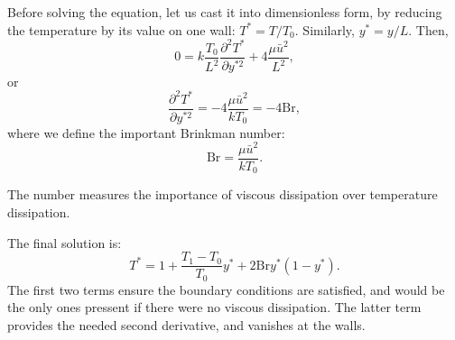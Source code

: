 Before solving the equation, let us cast it into dimensionless form,
by reducing the temperature by its value on one wall: $T^* =
T/T_0$. Similarly, $y^* = y/L$. Then,
\[
0 = k\frac{T_0}{ L^2} \frac{\partial^2 T^*}{\partial y^{*2}} +
4  \frac{ \mu \bar{u}^2  }{L^2} ,
\]
or
\[
 \frac{\partial^2 T^*}{\partial y^{*2}} = 
 -4  \frac{ \mu \bar{u}^2 }{ k T_0 }  =
 -4 \mathrm{Br} ,
\]
where we define the important Brinkman number:
\[
\mathrm{Br} =
\frac{ \mu \bar{u}^2 }{ k T_0 } .
\]

The number measures the importance of viscous dissipation over
temperature dissipation.

The final solution is:
\[
T^* = 1 + \frac{T_1-T_0}{T_0} y^* +
2 \mathrm{Br}  y^* \left(1- y^* \right) .
\]
The first two terms ensure the boundary conditions are satisfied, and
would be the only ones pressent if there were no viscous
dissipation. The latter term provides the needed second derivative,
and vanishes at the walls.

